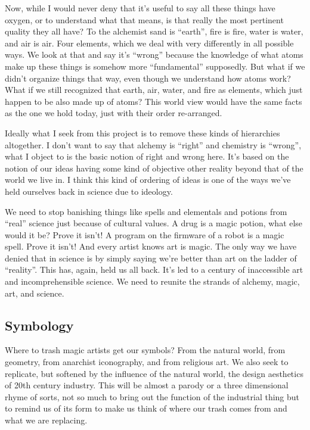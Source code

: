 Now, while I would never deny that it's useful to say all these things
have oxygen, or to understand what that means, is that really the most
pertinent quality they all have? To the alchemist sand is ``earth'',
fire is fire, water is water, and air is air. Four elements, which we
deal with very differently in all possible ways. We look at that and say
it's ``wrong'' because the knowledge of what atoms make up these things
is somehow more ``fundamental'' supposedly. But what if we didn't
organize things that way, even though we understand how atoms work? What
if we still recognized that earth, air, water, and fire as elements,
which just happen to be also made up of atoms? This world view would
have the same facts as the one we hold today, just with their order
re-arranged.

Ideally what I seek from this project is to remove these kinds of
hierarchies altogether. I don't want to say that alchemy is ``right''
and chemistry is ``wrong'', what I object to is the basic notion of
right and wrong here. It's based on the notion of our ideas having some
kind of objective other reality beyond that of the world we live in. I
think this kind of ordering of ideas is one of the ways we've held
ourselves back in science due to ideology.

We need to stop banishing things like spells and elementals and potions
from ``real'' science just because of cultural values. A drug is a magic
potion, what else would it be? Prove it isn't! A program on the firmware
of a robot is a magic spell. Prove it isn't! And every artist knows art
is magic. The only way we have denied that in science is by simply
saying we're better than art on the ladder of ``reality''. This has,
again, held us all back. It's led to a century of inaccessible art and
incomprehensible science. We need to reunite the strands of alchemy,
magic, art, and science.

\subsection{Symbology}\label{symbology}

Where to trash magic artists get our symbols? From the natural world,
from geometry, from anarchist iconography, and from religious art. We
also seek to replicate, but softened by the influence of the natural
world, the design aesthetics of 20th century industry. This will be
almost a parody or a three dimensional rhyme of sorts, not so much to
bring out the function of the industrial thing but to remind us of its
form to make us think of where our trash comes from and what we are
replacing.

